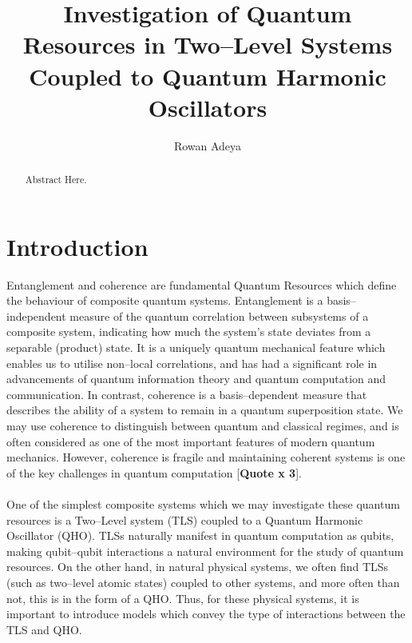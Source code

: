 \documentclass[12pt]{article}
\title{\textbf{Investigation of Quantum Resources in Two--Level Systems Coupled to Quantum Harmonic Oscillators}}
\author{Rowan Adeya}
\date{}
\begin{document}
\maketitle

\newpage

\vspace{\fill}
\begin{abstract}
    Abstract Here.
\end{abstract}
\vspace{\fill}

\newpage
{}
\tableofcontents

\newpage
\section{Introduction}

Entanglement and coherence are fundamental Quantum Resources which define the behaviour of composite quantum systems. Entanglement is a basis--independent measure of the quantum correlation between subsystems of a
composite system, indicating how much the system’s state deviates from a separable (product) state. It is a uniquely quantum mechanical feature which enables us to utilise non--local correlations, and has had a significant role in advancements of quantum information theory and quantum computation and communication. In contrast, coherence is a basis--dependent measure that describes the ability of a system to remain in a quantum superposition state. We may use coherence to distinguish between quantum and classical regimes, and is often considered as one of the most important features of modern quantum mechanics. However, coherence is fragile and maintaining coherent systems is one of the key challenges in quantum computation [\textbf{Quote x 3}]. \\
\\
One of the simplest composite systems which we may investigate these quantum resources is a Two--Level system (TLS) coupled to a Quantum Harmonic Oscillator (QHO). TLSs naturally manifest in quantum computation as qubits, making qubit–qubit interactions a natural environment for the study of quantum resources. On the other hand, in natural physical systems, we often find TLSs (such as two--level atomic states) coupled to other systems, and more often than not, this is in the form of a QHO. Thus, for these physical systems, it is important to introduce models which convey the type of interactions between the TLS and QHO. 
\end{document}
